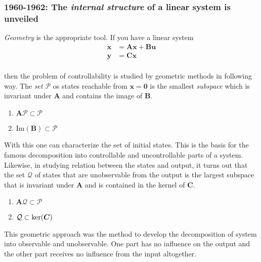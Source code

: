 \documentclass{article}
\begin{document}
\subsubsection*{1960-1962: The \textit{internal structure} of a linear system is unveiled}
\textit{Geometry} is the appropriate tool. If you have a linear system
\begin{equation*}
    \begin{split}
        \dot{\bm{x}}&=\bm{A}\bm{x}+\bm{B}\bm{u}\\
        \bm{y}&=\bm{C}\bm{x}\\        
    \end{split}
\end{equation*}

then the problem of controllability is studied by geometric methods in following way. The \textit{set} $\mathcal{P}$ os states reachable from $\bm{x}=\bm{0}$ is the smallest \textit{subspace} which is invariant under $\bm{A}$ and contains the image of $\bm{B}$.
\begin{enumerate}
    \item $\bm{A}\mathcal{P}\subset\mathcal{P}$
    \item Im$(\bm{B})\subset\mathcal{P}$
\end{enumerate}

With this one can characterize the set of initial states. This is the basis for the famous decomposition into controllable and uncontrollable parts of  a system. Likewise, in studying relation between the states and output, it turns out that the set $\mathcal{Q}$ of states that are unobservable from the output is the largest subspace that is invariant under $\bm{A}$ and is contained in the kernel of $\bm{C}$.
\begin{enumerate}
    \item $\bm{A}\mathcal{Q}\subset\mathcal{P}$
    \item $\mathcal{Q}\subset\textnormal{ker}(\bm{C})$
\end{enumerate}

This geometric approach was the method to develop the decomposition of system into  observable and unobservable. One part has no influence on the output and the other part receives no influence from the input altogether.
\end{document}
